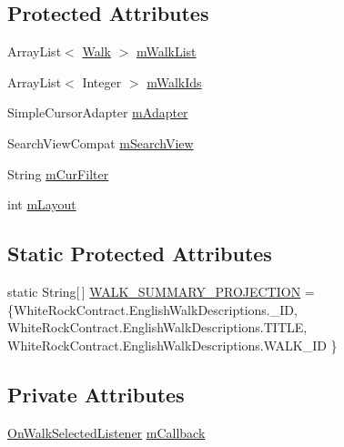 \subsection*{Protected Attributes}
\begin{DoxyCompactItemize}
\item 
Array\+List$<$ \hyperlink{classuk_1_1ac_1_1swan_1_1digitaltrails_1_1components_1_1_walk}{Walk} $>$ \hyperlink{classuk_1_1ac_1_1swan_1_1digitaltrails_1_1fragments_1_1_walk_list_fragment_a922fb05349e2afdb386f5ce03fdf6a7e}{m\+Walk\+List}
\item 
Array\+List$<$ Integer $>$ \hyperlink{classuk_1_1ac_1_1swan_1_1digitaltrails_1_1fragments_1_1_walk_list_fragment_ad139fcdf5608a476e92466b389229931}{m\+Walk\+Ids}
\item 
Simple\+Cursor\+Adapter \hyperlink{classuk_1_1ac_1_1swan_1_1digitaltrails_1_1fragments_1_1_walk_list_fragment_aa092b25e6fad559ef03d2f7f0be6f691}{m\+Adapter}
\item 
Search\+View\+Compat \hyperlink{classuk_1_1ac_1_1swan_1_1digitaltrails_1_1fragments_1_1_walk_list_fragment_ae85be36590c4c79cdb464539678ddf72}{m\+Search\+View}
\item 
String \hyperlink{classuk_1_1ac_1_1swan_1_1digitaltrails_1_1fragments_1_1_walk_list_fragment_a5acf4ef61210cc0c2ca02379621e1e75}{m\+Cur\+Filter}
\item 
int \hyperlink{classuk_1_1ac_1_1swan_1_1digitaltrails_1_1fragments_1_1_walk_list_fragment_ab3ae62a7e2ebef8610bf8dcffe8bca1a}{m\+Layout}
\end{DoxyCompactItemize}
\subsection*{Static Protected Attributes}
\begin{DoxyCompactItemize}
\item 
static String\mbox{[}$\,$\mbox{]} \hyperlink{classuk_1_1ac_1_1swan_1_1digitaltrails_1_1fragments_1_1_walk_list_fragment_a457173fbe4c810b68c502aa91dab8960}{W\+A\+L\+K\+\_\+\+S\+U\+M\+M\+A\+R\+Y\+\_\+\+P\+R\+O\+J\+E\+C\+T\+I\+O\+N} = \{White\+Rock\+Contract.\+English\+Walk\+Descriptions.\+\_\+\+I\+D, White\+Rock\+Contract.\+English\+Walk\+Descriptions.\+T\+I\+T\+L\+E, White\+Rock\+Contract.\+English\+Walk\+Descriptions.\+W\+A\+L\+K\+\_\+\+I\+D \}
\end{DoxyCompactItemize}
\subsection*{Private Attributes}
\begin{DoxyCompactItemize}
\item 
\hyperlink{interfaceuk_1_1ac_1_1swan_1_1digitaltrails_1_1fragments_1_1_walk_list_fragment_1_1_on_walk_selected_listener}{On\+Walk\+Selected\+Listener} \hyperlink{classuk_1_1ac_1_1swan_1_1digitaltrails_1_1fragments_1_1_walk_list_fragment_af887289d564f12d33172a0c0622f7f1d}{m\+Callback}
\end{DoxyCompactItemize}
